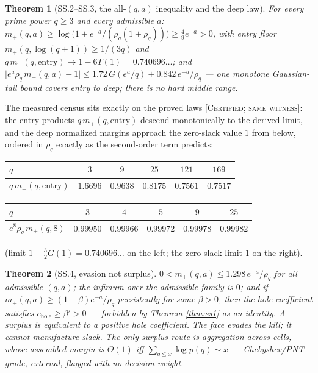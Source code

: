 \documentclass[11pt,reqno]{amsart}
\theoremstyle{plain}
\newtheorem{theorem}{Theorem}[section]
\theoremstyle{definition}
\theoremstyle{remark}
\newcommand{\grade}[1]{\textup{[\textsc{#1}]}}
\begin{document}
\begin{theorem}[SS.2--SS.3, the all-$(q,a)$ inequality and the deep law]\label{thm:ss23}
For every prime power $q \ge 3$ and every admissible $a$:
$m_+(q, a) \ge \log\bigl(1 + e^{-a}/(\rho_q(1+\rho_q))\bigr) \ge \tfrac49 e^{-a} > 0$, with
entry floor $m_+(q, \log(q+1)) \ge 1/(3q)$ and
$q\, m_+(q, \mathrm{entry}) \to 1 - 6T(1) = 0.740696\ldots$; and
$\bigl|e^a \rho_q\, m_+(q, a) - 1\bigr| \le 1.72\,G(e^a/q) + 0.842\, e^{-a}/\rho_q$ ---
one monotone Gaussian-tail bound covers entry to deep; there is no hard middle range.
\end{theorem}

The measured census sits exactly on the proved laws \grade{Certified; same witness}: the
entry products $q\,m_+(q, \mathrm{entry})$ descend monotonically to the derived limit, and
the deep normalized margins approach the zero-slack value $1$ from below, ordered in
$\rho_q$ exactly as the second-order term predicts:
\begin{center}
\small
\begin{tabular}{lccccc}
\toprule
$q$ & $3$ & $9$ & $25$ & $121$ & $169$ \\
\midrule
$q\,m_+(q,\mathrm{entry})$ & $1.6696$ & $0.9638$ & $0.8175$ & $0.7561$ & $0.7517$ \\
\bottomrule
\end{tabular}
\qquad
\begin{tabular}{lccccc}
\toprule
$q$ & $3$ & $4$ & $5$ & $9$ & $25$ \\
\midrule
$e^{8}\rho_q\, m_+(q, 8)$ & $0.99950$ & $0.99966$ & $0.99972$ & $0.99978$ & $0.99982$ \\
\bottomrule
\end{tabular}
\end{center}
(limit $1 - \tfrac32 G(1) = 0.740696\ldots$ on the left; the zero-slack limit $1$ on the
right).

\begin{theorem}[SS.4, evasion not surplus]\label{thm:ss4}
$0 < m_+(q, a) \le 1.298\, e^{-a}/\rho_q$ for all admissible $(q, a)$; the infimum over the
admissible family is $0$; and if $m_+(q, a) \ge (1+\beta)e^{-a}/\rho_q$ persistently for some
$\beta > 0$, then the hole coefficient satisfies $c_{\mathrm{hole}} \ge \beta' > 0$ ---
forbidden by Theorem \ref{thm:ss1} as an identity. \emph{A surplus is equivalent to a
positive hole coefficient. The face evades the kill; it cannot manufacture slack.} The only
surplus route is aggregation across cells, whose assembled margin is $\Theta(1)$ iff
$\sum_{q \le x} \log p(q) \sim x$ --- Chebyshev/PNT-grade, external, flagged with no decision
weight.
\end{theorem}
\end{document}
